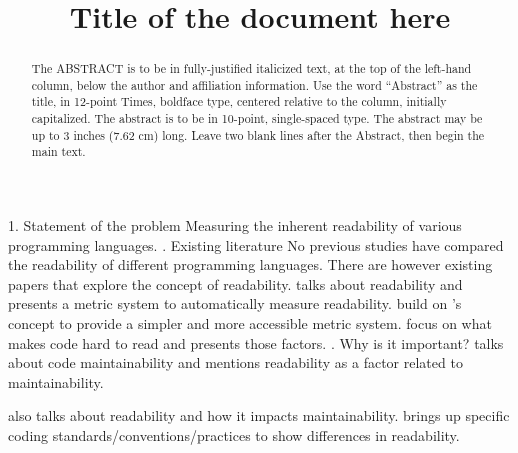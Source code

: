 \documentclass[times, 10pt,twocolumn]{IEEEtran}
\begin{document}
\title{Title of the document here}

\author{


}
\maketitle
\thispagestyle{empty}

\begin{abstract}
   The ABSTRACT is to be in fully-justified italicized text, at the top 
   of the left-hand column, below the author and affiliation 
   information. Use the word ``Abstract'' as the title, in 12-point 
   Times, boldface type, centered relative to the column, initially 
   capitalized. The abstract is to be in 10-point, single-spaced type. 
   The abstract may be up to 3 inches (7.62 cm) long. Leave two blank 
   lines after the Abstract, then begin the main text. 
\end{abstract}




1. Statement of the problem
  Measuring the inherent readability of various programming languages. 
  \newline {}. Existing literature
  No previous studies have compared the readability of different programming languages. There are however existing papers that explore the concept of readability. \cite{buse2010learning} talks about readability and presents a metric system to automatically measure readability. \cite{posnett2011simpler} build on \cite{buse2010learning}'s concept to provide a simpler and more accessible metric system. \cite{hansen2013makes} focus on what makes code hard to read and presents those factors. 
  \newline {}. Why is it important?
\cite{aggarwal2002integrated} talks about code maintainability and mentions readability as a factor related to maintainability. 

\cite{elshoff1982improving} also talks about readability and how it impacts maintainability. \cite{elshoff1982improving} brings up specific coding standards/conventions/practices to show differences in readability. 
\end{document}
